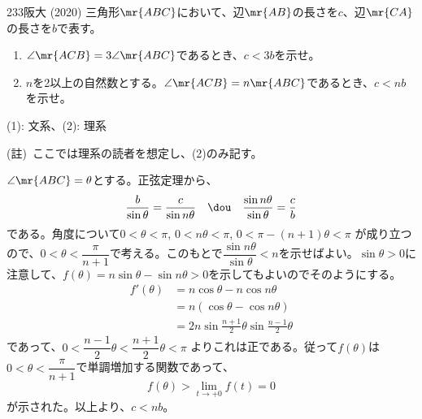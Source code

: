 \begin{prob}{233}{}{阪大 (2020)}
 三角形$\mr{ABC}$において、辺$\mr{AB}$の長さを$c$、辺$\mr{CA}$の長さを$b$で表す。
 \begin{enumerate}
  \item $\angle\mr{ACB}=3\angle\mr{ABC}$であるとき、$c<3b$を示せ。
  \item $n$を2以上の自然数とする。$\angle\mr{ACB}=n\mr{ABC}$であるとき、$c<nb$を示せ。
 \end{enumerate}
 \begin{flushright}
  {\small (1): 文系、(2): 理系}
 \end{flushright}
\end{prob}

(註)~ここでは理系の読者を想定し、(2)のみ記す。

$\angle\mr{ABC}=\theta$とする。正弦定理から、
\[ \frac{b}{\sin\theta}=\frac{c}{\sin n\theta} \quad\dou\quad \frac{\sin n\theta}{\sin\theta}=\frac{c}{b} \]
である。角度について$0<\theta<\pi$, $0<n\theta<\pi$, $0<\pi-(n+1)\theta<\pi$ が成り立つので、$0<\theta<\dfrac{\pi}{n+1}$で考える。このもとで$\dfrac{\sin n\theta}{\sin\theta}<n$を示せばよい。$\sin\theta>0$に注意して、$f(\theta)=n\sin\theta-\sin n\theta>0$を示してもよいのでそのようにする。
\begin{align*}
 f'(\theta)&=n\cos\theta-n\cos n\theta \\
 &=n(\cos\theta-\cos n\theta) \\
 &=2n\sin\frac{n+1}{2}\theta\sin\frac{n-1}{2}\theta
\end{align*}
であって、$0<\dfrac{n-1}{2}\theta<\dfrac{n+1}{2}\theta<\pi$ よりこれは正である。従って$f(\theta)$は$0<\theta<\dfrac{\pi}{n+1}$で単調増加する関数であって、
\[ f(\theta)>\lim_{t\to+0}f(t)=0 \]
が示された。以上より、$c<nb$。